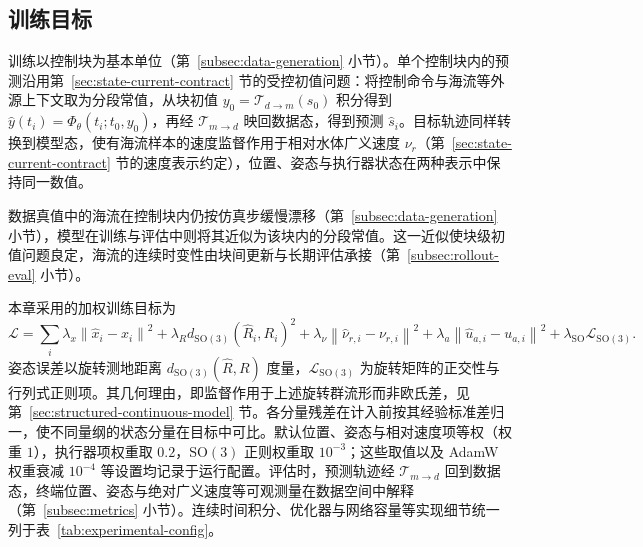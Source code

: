 \documentclass[UTF8,zihao=-4]{ctexrep}
\newcommand{\SO}{\mathrm{SO}}
\newcommand{\norm}[1]{\left\lVert #1\right\rVert}
\begin{document}
\subsection{训练目标}
\label{subsec:training-objective}

训练以控制块为基本单位（第~\ref{subsec:data-generation} 小节）。单个控制块内的预测沿用第~\ref{sec:state-current-contract} 节的受控初值问题：将控制命令与海流等外源上下文取为分段常值，从块初值 \(y_0=\mathcal{T}_{d\to m}(s_0)\) 积分得到 \(\hat y(t_i)=\Phi_\theta(t_i;t_0,y_0)\)，再经 \(\mathcal{T}_{m\to d}\) 映回数据态，得到预测 \(\hat s_i\)。目标轨迹同样转换到模型态，使有海流样本的速度监督作用于相对水体广义速度 \(\nu_r\)（第~\ref{sec:state-current-contract} 节的速度表示约定），位置、姿态与执行器状态在两种表示中保持同一数值。

数据真值中的海流在控制块内仍按仿真步缓慢漂移（第~\ref{subsec:data-generation} 小节），模型在训练与评估中则将其近似为该块内的分段常值。这一近似使块级初值问题良定，海流的连续时变性由块间更新与长期评估承接（第~\ref{subsec:rollout-eval} 小节）。

本章采用的加权训练目标为
\begin{equation}
  \mathcal{L}
  =
  \sum_i
  \lambda_x\norm{\hat x_i-x_i}^2
  +\lambda_R d_{\SO(3)}(\hat R_i,R_i)^2
  +\lambda_\nu\norm{\hat\nu_{r,i}-\nu_{r,i}}^2
  +\lambda_a\norm{\hat u_{a,i}-u_{a,i}}^2
  +\lambda_{\SO}\mathcal{L}_{\SO(3)} .
  \label{eq:training-loss}
\end{equation}
姿态误差以旋转测地距离 \(d_{\SO(3)}(\hat R,R)\) 度量，\(\mathcal{L}_{\SO(3)}\) 为旋转矩阵的正交性与行列式正则项。其几何理由，即监督作用于上述旋转群流形而非欧氏差，见第~\ref{sec:structured-continuous-model} 节。各分量残差在计入前按其经验标准差归一，使不同量纲的状态分量在目标中可比。默认位置、姿态与相对速度项等权（权重 \(1\)），执行器项权重取 \(0.2\)，\(\SO(3)\) 正则权重取 \(10^{-3}\)；这些取值以及 AdamW 权重衰减 \(10^{-4}\) 等设置均记录于运行配置。评估时，预测轨迹经 \(\mathcal{T}_{m\to d}\) 回到数据态，终端位置、姿态与绝对广义速度等可观测量在数据空间中解释（第~\ref{subsec:metrics} 小节）。连续时间积分、优化器与网络容量等实现细节统一列于表~\ref{tab:experimental-config}。
\end{document}
